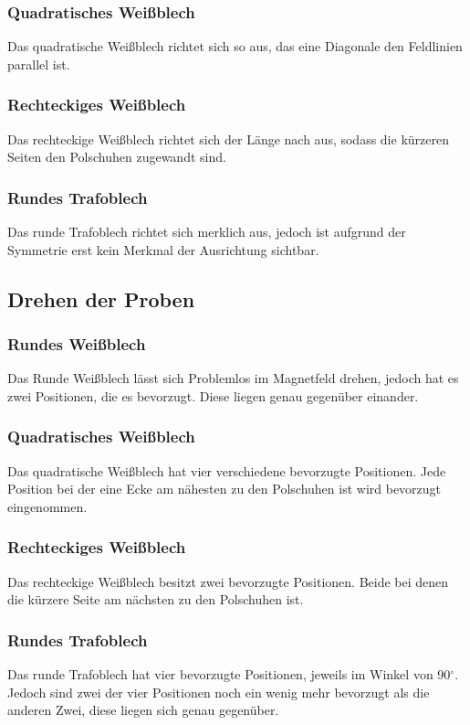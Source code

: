 \documentclass[a4paper,twoside,12pt,DIV=13,BCOR=5mm,numbers=noenddot,cleardoublepage=empty]{scrbook}
\begin{document}
            \subsubsection{Quadratisches Wei\ss{}blech}
            Das quadratische Wei\ss{}blech richtet sich so aus, das eine Diagonale den Feldlinien parallel ist. 
            \subsubsection{Rechteckiges Wei\ss{}blech}
            Das rechteckige Wei\ss{}blech richtet sich der L\"ange nach aus, sodass die k\"urzeren Seiten den Polschuhen zugewandt sind.
            \subsubsection{Rundes Trafoblech}
            Das runde Trafoblech richtet sich merklich aus, jedoch ist aufgrund der Symmetrie erst kein Merkmal der Ausrichtung sichtbar.
        \subsection{Drehen der Proben}
            \subsubsection{Rundes Wei\ss{}blech}
            Das Runde Wei\ss{}blech l\"asst sich Problemlos im Magnetfeld drehen, jedoch hat es zwei Positionen, die es bevorzugt. Diese liegen genau gegen\"uber einander.
            \subsubsection{Quadratisches Wei\ss{}blech}
            Das quadratische Wei\ss{}blech hat vier verschiedene bevorzugte Positionen. Jede Position bei der eine Ecke am n\"ahesten zu den Polschuhen ist wird bevorzugt eingenommen.
            \subsubsection{Rechteckiges Wei\ss{}blech}
            Das rechteckige Wei\ss{}blech besitzt zwei bevorzugte Positionen. Beide bei denen die k\"urzere Seite am n\"achsten zu den Polschuhen ist.
            \subsubsection{Rundes Trafoblech}
            Das runde Trafoblech hat vier bevorzugte Positionen, jeweils im Winkel von 90$^{\circ}$. Jedoch sind zwei der vier Positionen noch ein wenig mehr bevorzugt als die anderen Zwei, diese liegen sich genau gegen\"uber.
\end{document}
